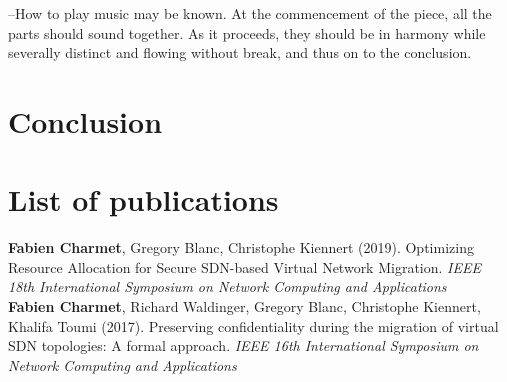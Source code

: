 \documentclass[a4paper, 11pt]{report}
\newcommand{\boxedtext}[1]{\fbox{\scriptsize\bfseries\textsf{#1}}}
\newcommand{\myremark}[2]{
   \textcolor{blue}{\boxedtext{#1}
      {\small$\blacktriangleright$\emph{\textsl{#2}}$\blacktriangleleft$}
}}
\newcommand\FC[1]{\myremark{FC}{#1}}
\theoremstyle{definition}
\begin{document}


\newpage


\newpage
\begin{savequote}
--How to play music may be known. At the commencement of the piece, all the parts should sound together. As it proceeds, they should be in harmony while severally distinct and flowing without break, and thus on to the conclusion.
\end{savequote}
\chapter{Conclusion}


\newpage
\chapter*{List of publications}
\textbf{Fabien Charmet}, Gregory Blanc, Christophe Kiennert (2019). Optimizing Resource Allocation for Secure SDN-based Virtual Network Migration. \textit{IEEE 18th International Symposium on Network Computing and Applications}\\

\textbf{Fabien Charmet}, Richard Waldinger, Gregory Blanc, Christophe Kiennert, Khalifa Toumi (2017). Preserving confidentiality during the migration of virtual SDN topologies: A formal approach. \textit{IEEE 16th International Symposium on Network Computing and Applications}

\newpage


\newpage
{}




% 
% 
\end{document}
